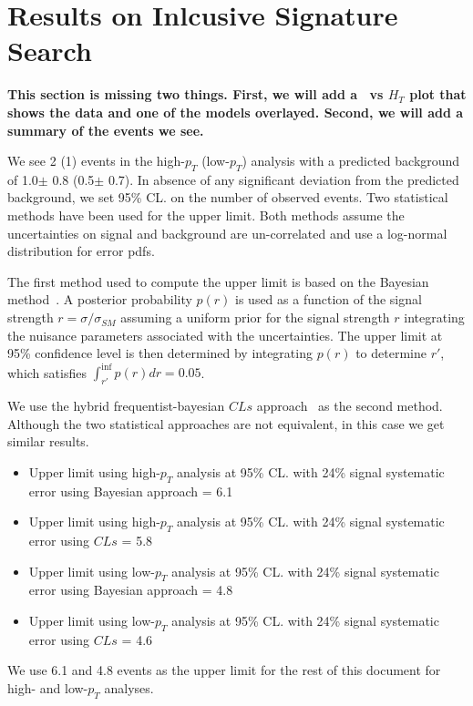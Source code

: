 \section{Results on Inlcusive Signature Search}
\label{sec:inclresults}

{\bf This section is missing two things. First, we will add a \met\ vs $H_T$ plot that shows the data and
one of the models overlayed. Second, we will add a summary of the events we see. 
}

We see 2 (1) events in the high-$p_T$ (low-$p_T$) analysis with a predicted background of
1.0$\pm$ 0.8 (0.5$\pm$ 0.7).
In absence of any significant deviation from the predicted background, we set 95\% CL. on the number of observed events. 
Two statistical methods have been used for the upper limit. 
Both methods assume the uncertainties on signal and background are un-correlated and use a log-normal distribution for error pdfs. 

The first method used to compute the upper limit is based on the Bayesian method~\cite{bayesian}.
A posterior probability $p(r)$ is used as a function of the signal strength $r = \sigma/\sigma_{SM}$ 
assuming a uniform prior for the signal strength $r$ integrating the nuisance parameters associated with the uncertainties.
The upper limit at 95\% confidence level is then determined by integrating $p(r)$ to determine $r'$, 
which satisfies $\int_{r'}^{\inf} p(r) dr = 0.05$.

We use the hybrid frequentist-bayesian $CLs$ approach~\cite{CLSxx} as the second method. 
Although the two statistical approaches are not equivalent, in this case we get similar results. 

\begin{itemize}
\item Upper limit using high-$p_T$ analysis at 95\% CL. with 24\% signal systematic error using Bayesian approach = 6.1  
\item Upper limit using high-$p_T$ analysis at 95\% CL. with 24\% signal systematic error using $CLs$ = 5.8  
\item Upper limit using low-$p_T$ analysis at 95\% CL. with 24\% signal systematic error using Bayesian approach = 4.8  
\item Upper limit using low-$p_T$ analysis at 95\% CL. with 24\% signal systematic error using $CLs$ = 4.6  
\end{itemize}

We use 6.1 and 4.8 events as the upper limit for the rest of this document for high- and low-$p_T$ analyses.
